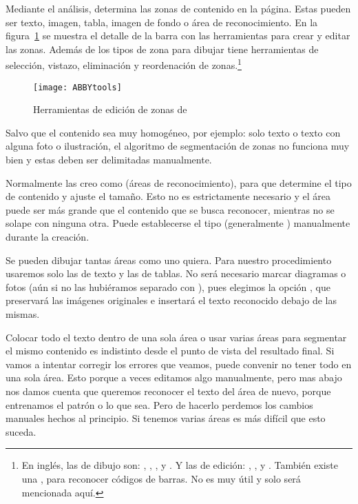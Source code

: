 \documentclass[%
	a5paper,
	10pt,
	twoside,
	openright,
	final,
]{memoir}
\begin{document}
	Mediante el análisis, \abby determina las zonas de contenido en la página. Estas pueden ser texto, imagen, tabla, imagen de fondo o área de reconocimiento. En la figura~\ref{fig:ABBYtools} se muestra el detalle de la barra con las herramientas para crear y editar las zonas. Además de los tipos de zona para dibujar tiene herramientas de selección, vistazo, eliminación y reordenación de zonas.\footnote{En inglés, las de dibujo son: , , ,  y . Y las de edición: , ,  y . También existe una , para reconocer códigos de barras. No es muy útil y solo será mencionada aquí.}

	\begin{figure}
		\centering
		\texttt{[image: ABBYtools]}
		\caption{Herramientas de edición de zonas de \abby\label{fig:ABBYtools}}
	\end{figure}

	Salvo que el contenido sea muy homogéneo, por ejemplo: solo texto o texto con alguna foto o ilustración, el algoritmo de segmentación de zonas no funciona muy bien y estas deben ser delimitadas manualmente.

	Normalmente las creo como  (áreas de reconocimiento), para que \abby determine el tipo de contenido y ajuste el tamaño. Esto no es estrictamente necesario y el área puede ser más grande que el contenido que se busca reconocer, mientras no se solape con ninguna otra. Puede establecerse el tipo (generalmente ) manualmente durante la creación.

	Se pueden dibujar tantas áreas como uno quiera. Para nuestro procedimiento usaremos solo las de texto y las de tablas. No será necesario marcar diagramas o fotos (aún si no las hubiéramos separado con \scantailor), pues elegimos la opción , que preservará las imágenes originales e insertará el texto reconocido debajo de las mismas.

	Colocar todo el texto dentro de una sola área o usar varias áreas para segmentar el mismo contenido es indistinto desde el punto de vista del resultado final. Si vamos a intentar corregir los errores que veamos, puede convenir no tener todo en una sola área. Esto porque a veces editamos algo manualmente, pero mas abajo nos damos cuenta que queremos reconocer el texto del área de nuevo, porque entrenamos el patrón o lo que sea. Pero de hacerlo perdemos los cambios manuales hechos al principio. Si tenemos varias áreas es más difícil que esto suceda.
\end{document}
